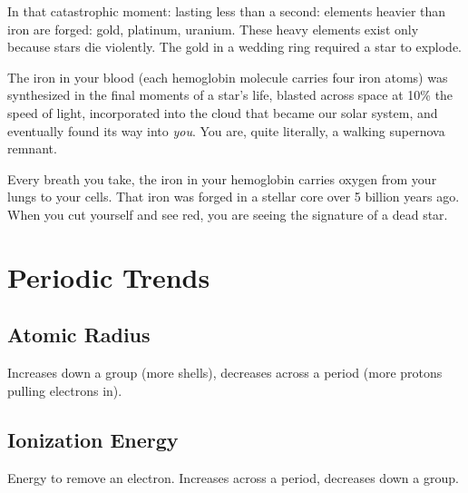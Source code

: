 \documentclass[
  11pt,
  letterpaper,
  twoside,
  openright]{book}
\begin{document}
In that catastrophic moment: lasting less than a second: elements
heavier than iron are forged: gold, platinum, uranium. These heavy
elements exist only because stars die violently. The gold in a wedding
ring required a star to explode.

The iron in your blood (each hemoglobin molecule carries four iron
atoms) was synthesized in the final moments of a star's life, blasted
across space at 10\% the speed of light, incorporated into the cloud
that became our solar system, and eventually found its way into
\emph{you}. You are, quite literally, a walking supernova remnant.

\begin{tcolorbox}[enhanced jigsaw, leftrule=.75mm, title=\textcolor{quarto-callout-note-color}{\faInfo}\hspace{0.5em}{The Cosmic Origin of Blood}, bottomrule=.15mm, opacityback=0, coltitle=black, arc=.35mm, colframe=quarto-callout-note-color-frame, colbacktitle=quarto-callout-note-color!10!white, colback=white, titlerule=0mm, breakable, bottomtitle=1mm, toptitle=1mm, rightrule=.15mm, toprule=.15mm, left=2mm, opacitybacktitle=0.6]

Every breath you take, the iron in your hemoglobin carries oxygen from
your lungs to your cells. That iron was forged in a stellar core over 5
billion years ago. When you cut yourself and see red, you are seeing the
signature of a dead star.

\end{tcolorbox}

\section{Periodic Trends}\label{periodic-trends}

\subsection{Atomic Radius}\label{atomic-radius}

Increases down a group (more shells), decreases across a period (more
protons pulling electrons in).

\subsection{Ionization Energy}\label{ionization-energy}

Energy to remove an electron. Increases across a period, decreases down
a group.
\end{document}
